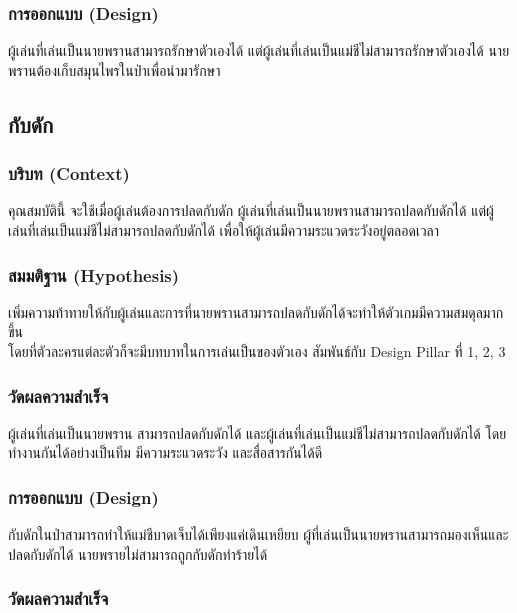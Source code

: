 \subsubsection{การออกแบบ (Design)}

ผู้เล่นที่เล่นเป็นนายพรานสามารถรักษาตัวเองได้ แต่ผู้เล่นที่เล่นเป็นแม่ชีไม่สามารถรักษาตัวเองได้
นายพรานต้องเก็บสมุนไพรในป่าเพื่อนำมารักษา

\subsection{กับดัก}

\subsubsection{บริบท (Context)}

คุณสมบัตินี้ จะใช้เมื่อผู้เล่นต้องการปลดกับดัก ผู้เล่นที่เล่นเป็นนายพรานสามารถปลดกับดักได้ แต่ผู้เล่นที่เล่นเป็นแม่ชีไม่สามารถปลดกับดักได้ เพื่อให้ผู้เล่นมีความระแวดระวังอยู่ตลอดเวลา

\subsubsection{สมมติฐาน (Hypothesis)}

เพิ่มความท้าทายให้กับผู้เล่นและการที่นายพรานสามารถปลดกับดักได้จะทำให้ตัวเกมมีความสมดุลมากขึ้น \\ โดยที่ตัวละครแต่ละตัวก็จะมีบทบาทในการเล่นเป็นของตัวเอง สัมพันธ์กับ Design Pillar ที่ 1, 2, 3

\subsubsection{วัดผลความสำเร็จ}

ผู้เล่นที่เล่นเป็นนายพราน สามารถปลดกับดักได้ และผู้เล่นที่เล่นเป็นแม่ชีไม่สามารถปลดกับดักได้ โดยทำงานกันได้อย่างเป็นทีม มีความระแวดระวัง และสื่อสารกันได้ดี

\subsubsection{การออกแบบ (Design)}

กับดักในป่าสามารถทำให้แม่ชีบาดเจ็บได้เพียงแค่เดินเหยียบ ผู้ที่เล่นเป็นนายพรานสามารถมองเห็นและปลดกับดักได้ นายพรายไม่สามารถถูกกับดักทำร้ายได้

\subsubsection{วัดผลความสำเร็จ}

